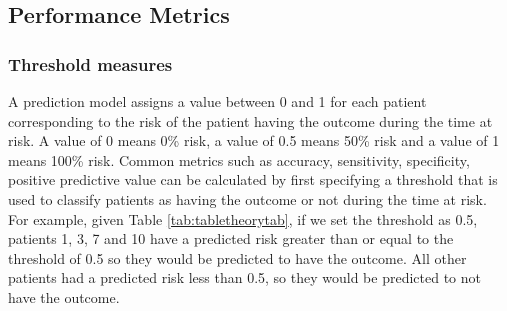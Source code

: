 \documentclass[11pt]{book}
\theoremstyle{definition}
\theoremstyle{definition}
\theoremstyle{definition}
\theoremstyle{remark}
\begin{document}
\hypertarget{performance}{%
\subsection{Performance Metrics}\label{performance}}

\hypertarget{threshold-measures}{%
\subsubsection*{Threshold measures}\label{threshold-measures}}

A prediction model assigns a value between 0 and 1 for each patient corresponding to the risk of the patient having the outcome during the time at risk. A value of 0 means 0\% risk, a value of 0.5 means 50\% risk and a value of 1 means 100\% risk. Common metrics such as accuracy, sensitivity, specificity, positive predictive value can be calculated by first specifying a threshold that is used to classify patients as having the outcome or not during the time at risk. For example, given Table \ref{tab:tabletheorytab}, if we set the threshold as 0.5, patients 1, 3, 7 and 10 have a predicted risk greater than or equal to the threshold of 0.5 so they would be predicted to have the outcome. All other patients had a predicted risk less than 0.5, so they would be predicted to not have the outcome.     
\end{document}
